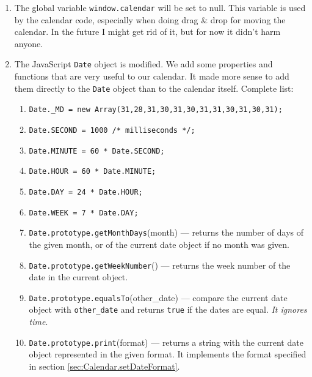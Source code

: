 \documentclass[a4paper,twoside,10pt]{dynadoc}
\begin{document}
\begin{enumerate}

\item The global variable \texttt{window.calendar} will be set to null.  This
variable is used by the calendar code, especially when doing drag \& drop for
moving the calendar.  In the future I might get rid of it, but for now it
didn't harm anyone.

\item The JavaScript \texttt{Date} object is modified.  We add some properties
and functions that are very useful to our calendar.  It made more sense to add
them directly to the \texttt{Date} object than to the calendar itself.
Complete list:

\begin{enumerate}

\item \texttt{Date.\_MD    = new Array(31,28,31,30,31,30,31,31,30,31,30,31);}
\item \texttt{Date.SECOND = 1000 /* milliseconds */;}
\item \texttt{Date.MINUTE = 60 * Date.SECOND;}
\item \texttt{Date.HOUR   = 60 * Date.MINUTE;}
\item \texttt{Date.DAY    = 24 * Date.HOUR;}
\item \texttt{Date.WEEK   =  7 * Date.DAY;}

\item \texttt{Date.prototype.getMonthDays}(month) --- returns the number of days
of the given month, or of the current date object if no month was given.

\item \texttt{Date.prototype.getWeekNumber}() --- returns the week number of the
date in the current object.

\item \texttt{Date.prototype.equalsTo}(other\_date) --- compare the current date
object with \texttt{other\_date} and returns \texttt{true} if the dates are
equal.  \emph{It ignores time}.

\item \texttt{Date.prototype.print}(format) --- returns a string with the
current date object represented in the given format.  It implements the format
specified in section \ref{sec:Calendar.setDateFormat}.

\end{enumerate}

\end{enumerate}
\end{document}

